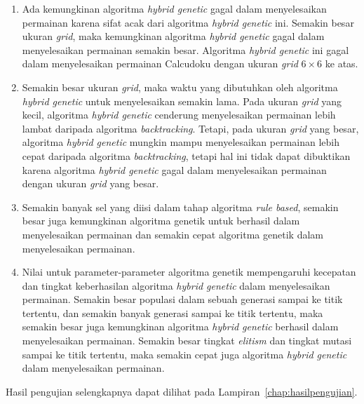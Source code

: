 \begin{enumerate}
\item Ada kemungkinan algoritma \textit{hybrid genetic} gagal dalam menyelesaikan permainan karena sifat acak dari algoritma \textit{hybrid genetic} ini. Semakin besar ukuran \textit{grid}, maka kemungkinan algoritma \textit{hybrid genetic} gagal dalam menyelesaikan permainan semakin besar. Algoritma \textit{hybrid genetic} ini gagal dalam menyelesaikan permainan Calcudoku dengan ukuran \textit{grid} \begin{math}6 \times 6\end{math} ke atas.
\item Semakin besar ukuran \textit{grid}, maka waktu yang dibutuhkan oleh algoritma \textit{hybrid genetic} untuk menyelesaikan semakin lama. Pada ukuran \textit{grid} yang kecil, algoritma \textit{hybrid genetic} cenderung menyelesaikan permainan lebih lambat daripada algoritma \textit{backtracking}. Tetapi, pada ukuran \textit{grid} yang besar, algoritma \textit{hybrid genetic} mungkin mampu menyelesaikan permainan lebih cepat daripada algoritma \textit{backtracking}, tetapi hal ini tidak dapat dibuktikan karena algoritma \textit{hybrid genetic} gagal dalam menyelesaikan permainan dengan ukuran \textit{grid} yang besar.
\item Semakin banyak sel yang diisi dalam tahap algoritma \textit{rule based}, semakin besar juga kemungkinan algoritma genetik untuk berhasil dalam menyelesaikan permainan dan semakin cepat algoritma genetik dalam menyelesaikan permainan.
\item Nilai untuk parameter-parameter algoritma genetik mempengaruhi kecepatan dan tingkat keberhasilan algoritma \textit{hybrid genetic} dalam menyelesaikan permainan. Semakin besar populasi dalam sebuah generasi sampai ke titik tertentu, dan semakin banyak generasi sampai ke titik tertentu, maka semakin besar juga kemungkinan algoritma \textit{hybrid genetic} berhasil dalam menyelesaikan permainan. Semakin besar tingkat \textit{elitism} dan tingkat mutasi sampai ke titik tertentu, maka semakin cepat juga algoritma \textit{hybrid genetic} dalam menyelesaikan permainan.
\end{enumerate}

Hasil pengujian selengkapnya dapat dilihat pada Lampiran~\ref{chap:hasilpengujian}.